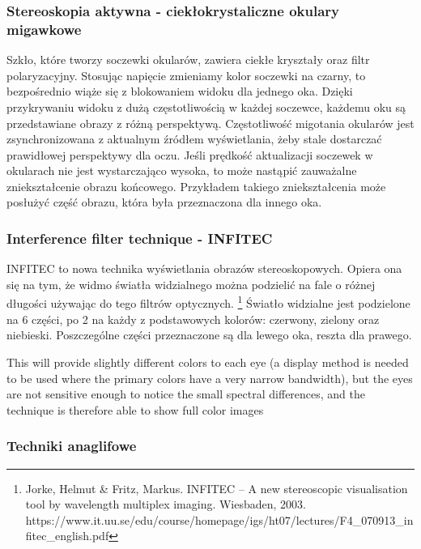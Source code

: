 \subsubsection{Stereoskopia aktywna - ciekłokrystaliczne okulary migawkowe} 
Szkło, które tworzy soczewki okularów, zawiera ciekłe kryształy oraz filtr polaryzacyjny. Stosując napięcie zmieniamy kolor soczewki na czarny, to bezpośrednio wiąże się z blokowaniem widoku dla jednego oka. Dzięki przykrywaniu widoku z dużą częstotliwością w każdej soczewce, każdemu oku są przedstawiane obrazy z różną perspektywą. Częstotliwość migotania okularów jest zsynchronizowana z aktualnym źródłem wyświetlania, żeby stale dostarczać prawidłowej perspektywy dla oczu. Jeśli prędkość aktualizacji soczewek w okularach nie jest wystarczająco wysoka, to może nastąpić zauważalne zniekształcenie obrazu końcowego. Przykładem takiego zniekształcenia może posłużyć część obrazu, która była przeznaczona dla innego oka. 


\subsubsection{Interference filter technique - INFITEC}
INFITEC to nowa technika wyświetlania obrazów stereoskopowych. Opiera ona się na tym, że widmo światła widzialnego można podzielić na fale o różnej długości używając do tego filtrów optycznych. \footnote{Jorke, Helmut & Fritz, Markus. INFITEC – A new stereoscopic visualisation tool
by wavelength multiplex imaging. Wiesbaden, 2003.\\https://www.it.uu.se/edu/course/homepage/igs/ht07/lectures/F4_070913_infitec_english.pdf} Światło widzialne jest podzielone na 6 części, po 2 na każdy z podstawowych kolorów: czerwony, zielony oraz niebieski. Poszczególne części przeznaczone są dla lewego oka, reszta dla prawego.

 This will provide slightly different colors to
each eye (a display method is needed to be used where the primary colors have
a very narrow bandwidth), but the eyes are not sensitive enough to notice the
small spectral differences, and the technique is therefore able to show full
color images


\subsubsection{Techniki anaglifowe}





















